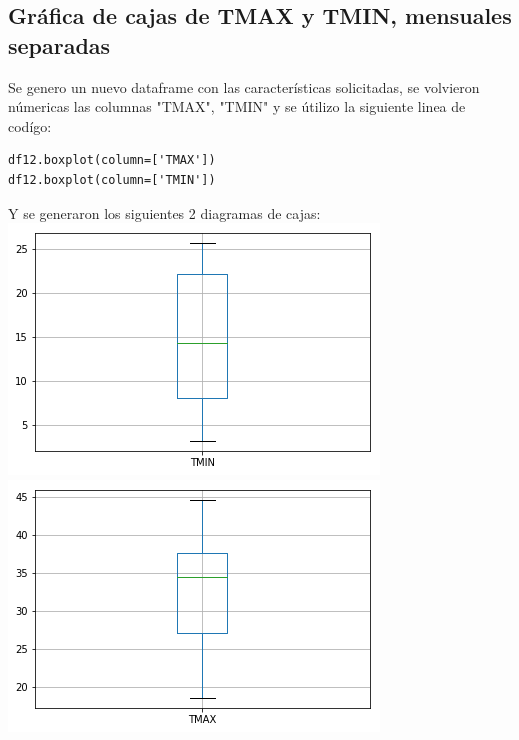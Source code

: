 \documentclass{article}
\begin{document}
\subsection{Gráfica de cajas de TMAX y TMIN, mensuales separadas}
Se genero un nuevo dataframe con las características solicitadas, se volvieron númericas las columnas "TMAX", "TMIN" y se útilizo la siguiente linea de codígo:
\begin{verbatim}
df12.boxplot(column=['TMAX'])
df12.boxplot(column=['TMIN'])
\end{verbatim}
Y se generaron los siguientes 2 diagramas de cajas: \\

\includegraphics[scale=.7]{cajatminmensual.png}
\includegraphics[scale=.7]{cajatmaxmensual.png}
\end{document}
